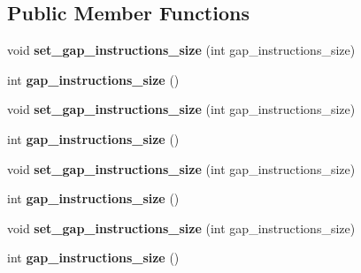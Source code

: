 \subsection*{Public Member Functions}
\begin{DoxyCompactItemize}
\item 
void {\bfseries set\+\_\+gap\+\_\+instructions\+\_\+size} (int gap\+\_\+instructions\+\_\+size)\hypertarget{classv8_1_1internal_1_1_l_lazy_bailout_a7509286bd9c0e27f64f58708abdd00ff}{}\label{classv8_1_1internal_1_1_l_lazy_bailout_a7509286bd9c0e27f64f58708abdd00ff}

\item 
int {\bfseries gap\+\_\+instructions\+\_\+size} ()\hypertarget{classv8_1_1internal_1_1_l_lazy_bailout_aa6b2a86278324e4287fe8faa7aef8450}{}\label{classv8_1_1internal_1_1_l_lazy_bailout_aa6b2a86278324e4287fe8faa7aef8450}

\item 
void {\bfseries set\+\_\+gap\+\_\+instructions\+\_\+size} (int gap\+\_\+instructions\+\_\+size)\hypertarget{classv8_1_1internal_1_1_l_lazy_bailout_a7509286bd9c0e27f64f58708abdd00ff}{}\label{classv8_1_1internal_1_1_l_lazy_bailout_a7509286bd9c0e27f64f58708abdd00ff}

\item 
int {\bfseries gap\+\_\+instructions\+\_\+size} ()\hypertarget{classv8_1_1internal_1_1_l_lazy_bailout_aa6b2a86278324e4287fe8faa7aef8450}{}\label{classv8_1_1internal_1_1_l_lazy_bailout_aa6b2a86278324e4287fe8faa7aef8450}

\item 
void {\bfseries set\+\_\+gap\+\_\+instructions\+\_\+size} (int gap\+\_\+instructions\+\_\+size)\hypertarget{classv8_1_1internal_1_1_l_lazy_bailout_a7509286bd9c0e27f64f58708abdd00ff}{}\label{classv8_1_1internal_1_1_l_lazy_bailout_a7509286bd9c0e27f64f58708abdd00ff}

\item 
int {\bfseries gap\+\_\+instructions\+\_\+size} ()\hypertarget{classv8_1_1internal_1_1_l_lazy_bailout_aa6b2a86278324e4287fe8faa7aef8450}{}\label{classv8_1_1internal_1_1_l_lazy_bailout_aa6b2a86278324e4287fe8faa7aef8450}

\item 
void {\bfseries set\+\_\+gap\+\_\+instructions\+\_\+size} (int gap\+\_\+instructions\+\_\+size)\hypertarget{classv8_1_1internal_1_1_l_lazy_bailout_a7509286bd9c0e27f64f58708abdd00ff}{}\label{classv8_1_1internal_1_1_l_lazy_bailout_a7509286bd9c0e27f64f58708abdd00ff}

\item 
int {\bfseries gap\+\_\+instructions\+\_\+size} ()\hypertarget{classv8_1_1internal_1_1_l_lazy_bailout_aa6b2a86278324e4287fe8faa7aef8450}{}\label{classv8_1_1internal_1_1_l_lazy_bailout_aa6b2a86278324e4287fe8faa7aef8450}


\end{DoxyCompactItemize}
